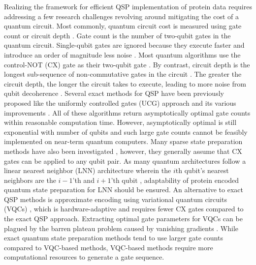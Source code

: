 Realizing the framework for efficient QSP implementation of protein data requires addressing a few research challenges revolving around mitigating the cost of a 
quantum circuit. Most commonly, quantum circuit cost is measured using
gate count or circuit depth \cite{1629135}. Gate count is the number of 
two-qubit gates in the quantum circuit. Single-qubit gates are ignored because 
they execute faster and introduce an order of magnitude less noise 
\cite{1629135}. Most quantum algorithms use the control-NOT (CX) gate as their 
two-qubit gate \cite{PhysRevLett.103.150502, 1629135, zhang2020toward, divincenzo1995two}. 
By contrast, circuit depth is the longest sub-sequence of non-commutative gates 
in the circuit \cite{1629135}. The greater the circuit depth, the longer the 
circuit takes to execute, leading to more noise from qubit decoherence \cite{10044235}. Several exact methods for QSP have been previously proposed like the uniformly controlled gates (UCG) approach \cite{1629135} and its various improvements \cite{bergholm2005quantum, PhysRevA.83.032302, 10044235, zhang2022quantum}. All of these algorithms return
asymptotically optimal gate counts within reasonable computation time.
However, asymptotically optimal is still exponential with number of 
qubits and such large gate counts cannot be feasibly implemented on near-term 
quantum computers. Many sparse state preparation methods have also been investigated \cite{10.1109/DAC18074.2021.9586240, Malvetti2021quantumcircuits}, however, they generally assume that CX gates can be applied to any qubit pair. As many quantum architectures follow a linear nearest neighbor (LNN) architecture wherein the $i$th qubit's nearest neighbors 
are the $i - 1$'th and $i + 1$'th qubit 
\cite{bravyi2022future, 
Saeedi_Wille_Drechsler_2010}, adaptability of protein encoded quantum state preparation for LNN should be ensured. 
An alternative to exact QSP methods is approximate encoding using
variational quantum circuits (VQCs) \cite{PhysRevResearch.4.023136, PhysRevA.98.032309}, which is hardware-adaptive and requires fewer CX gates compared to the exact QSP approach. Extracting optimal gate parameters for VQCs can be plagued by the barren plateau problem caused by vanishing gradients \cite{ rivera2021avoiding, PhysRevResearch.4.023136}. While exact quantum state preparation methods tend to use larger gate counts
compared to VQC-based methods, VQC-based methods require more computational
resources to generate a gate sequence.


